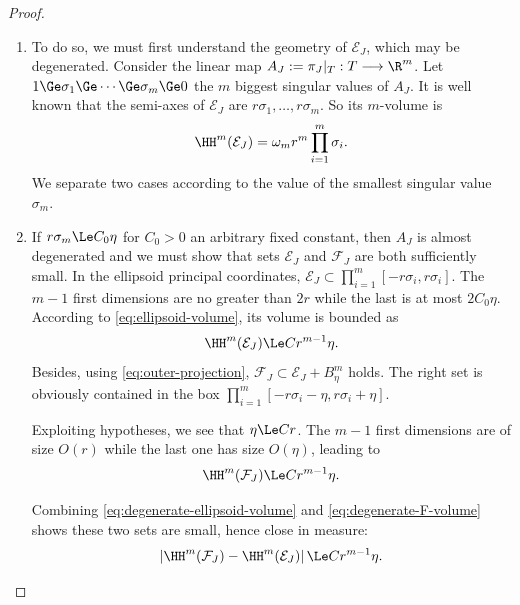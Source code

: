 \begin{proof}
\begin{enumerate}
    The difficulty lies now in controlling the volume of
    $\mathcal{F}_J$, which must also contain a big enough part of
    $\mathcal{E}_J$. 

    \item To do so, we must first understand the geometry of
      $\mathcal{E}_J$, which may be degenerated.  Consider the linear
      map $A_J:=\pi_J|_T:T\longrightarrow \R^m$. Let $1 \Ge \sigma_1
      \Ge \cdots \Ge \sigma_m \Ge 0$ the $m$ biggest singular values
      of $A_J$. It is well known that the semi-axes of $\mathcal{E}_J$ are
      $r\sigma_1,\ldots,r\sigma_m$. So its $m$-volume is
      \begin{equation}
        \label{eq:ellipsoid-volume}
        \HH^m(\mathcal{E}_J)
        =
        \omega_m r^m\prod_{i=1}^m\sigma_i.
      \end{equation}
      We separate two cases according to the value of the smallest
      singular value $\sigma_m$.

    \item If $r\sigma_m\Le C_0\eta$ for $C_0>0$ an arbitrary fixed
      constant, then $A_J$ is almost degenerated and we must show that
      sets $\mathcal{E}_J$ and $\mathcal{F}_J$ are both sufficiently
      small.  In the ellipsoid principal coordinates, $\mathcal{E}_J
      \subset \prod_{i=1}^m [-r\sigma_i,r\sigma_i]$. The $m-1$ first
      dimensions are no greater than $2r$ while the last is at most
      $2C_0\eta$. According to \eqref{eq:ellipsoid-volume}, its volume is bounded as
      \begin{equation}
        \label{eq:degenerate-ellipsoid-volume}
        \HH^m(\mathcal{E}_J)
        \Le C r^{m-1}\eta.
      \end{equation}
      Besides, using \eqref{eq:outer-projection},
      $\mathcal{F}_J\subset\mathcal{E}_J+B^m_\eta$ holds. The right
      set is obviously contained in the box $\prod_{i=1}^m
      [-r\sigma_i-\eta,r\sigma_i+\eta]$.

      Exploiting hypotheses, we see that $\eta \Le C r$. The $m-1$
      first dimensions are of size $O(r)$ while the last one has size
      $O(\eta)$, leading to
      \begin{equation}
        \label{eq:degenerate-F-volume}
        \HH^m(\mathcal{F}_J)
        \Le C r^{m-1}\eta.
      \end{equation}

      Combining \eqref{eq:degenerate-ellipsoid-volume} and
      \eqref{eq:degenerate-F-volume} shows these two sets are small, hence
      close in measure:
      \begin{equation}
        \label{eq:degenerate-result}
        \left|
        \HH^m(\mathcal{F}_J)
        -
        \HH^m(\mathcal{E}_J)
        \right|
        \Le C r^{m-1}\eta.
      \end{equation}
      

\end{enumerate}
\end{proof}
